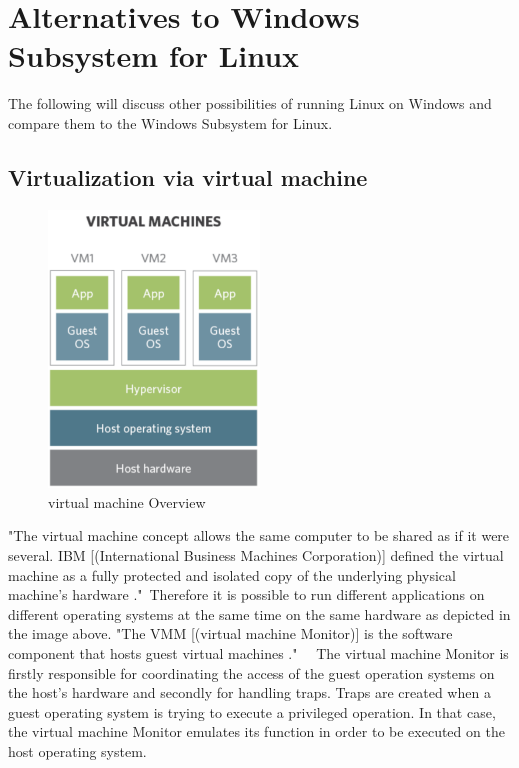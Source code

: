 \documentclass[utf8,biblatex, ngerman, english]{lni}
\begin{document}
\section{Alternatives to Windows Subsystem for Linux}
The following will discuss other possibilities of running Linux on Windows and compare them to the Windows Subsystem for Linux.

\subsection{Virtualization via virtual machine}

\begin{figure}
  \centering
  \includegraphics[width=0.5\textwidth]{VM.pdf}
  \caption{virtual machine Overview}
  \label{img:vm}
\end{figure}


"The virtual machine concept allows the same computer to be shared as if it were several. IBM [(International Business Machines Corporation)] defined the virtual machine as a fully protected and isolated copy of the underlying physical machine’s hardware \cite[p. 2]{Ro01}."\ 
Therefore it is possible to run different applications on different operating systems at the same time on the same hardware as depicted in the image above. "The VMM [(virtual machine Monitor)] is the software component that hosts guest virtual machines \cite[p. 3]{Ro01}." \ \ The virtual machine Monitor is firstly responsible for coordinating the access of the guest operation systems on the host's hardware and secondly for handling traps. Traps are created when a guest operating system is trying to execute a privileged operation. In that case, the virtual machine Monitor emulates its function in order to be executed on the host operating system.
\end{document}

